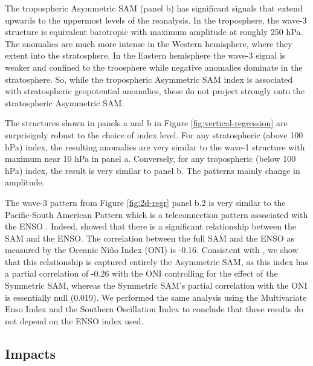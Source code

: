 \documentclass[]{ametsocV5}
\begin{document}
The tropospheric Asymmetric SAM (panel b) has significant signals that
extend upwards to the uppermost levels of the reanalysis. In the
troposphere, the wave-3 structure is equivalent barotropic with maximum
amplitude at roughly 250 hPa. The anomalies are much more intense in the
Western hemisphere, where they extent into the stratosphere. In the
Eastern hemisphere the wave-3 signal is weaker and confined to the
troosphere while negative anomalies dominate in the stratosphere. So,
while the tropospheric Asymmetric SAM index is associated with
stratospheric geopotential anomalies, these do not project strongly onto
the stratospheric Asymmetric SAM.

The structures shown in panels a and b in Figure
\ref{fig:vertical-regression} are surprisignly robust to the choice of
index level. For any stratospheric (above 100 hPa) index, the resulting
anomalies are very similar to the wave-1 structure with maximum near 10
hPa in panel a. Conversely, for any tropospheric (below 100 hPa) index,
the result is very similar to panel b. The patterns mainly change in
amplitude.

The wave-3 pattern from Figure \ref{fig:2d-regr} panel b.2 is very
similar to the Pacific-South American Pattern \citep{mo1987, kidson1988}
which is a teleconnection pattern associated with the ENSO
\citep{karoly1989}. Indeed, \citet{fogt2011} showed that there is a
significant relationship between the SAM and the ENSO. The correlation
between the full SAM and the ENSO as measured by the Oceanic Niño Index
\citep{bamston1997} (ONI) is -0.16. Consistent with \citet{fan2007}, we
show that this relationship is captured entirely the Asymmetric SAM, as
this index has a partial correlation of -0.26 with the ONI controlling
for the effect of the Symmetric SAM, whereas the Symmetric SAM's partial
correlation with the ONI is essentially null (0.019). We performed the
same analysis using the Multivariate Enso Index \citep{wolter2011} and
the Southern Oscillation Index \citep{ropelewski1987} to conclude that
these results do not depend on the ENSO index used.

\subsection{Impacts}
\end{document}
